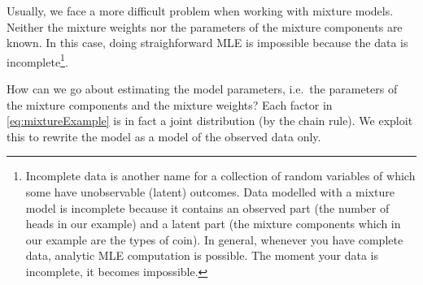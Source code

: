 \documentclass[a4paper,11pt,leqno]{report}\usepackage[]{graphicx}\usepackage[]{color}
\newcommand{\philip}[1]{ \textcolor{red}{\textbf{Philip:} #1}}
\begin{document}
Usually, we face a more difficult problem when working with mixture models. Neither the mixture
weights nor the parameters of the mixture components are known. In this case, doing straighforward MLE is impossible because the data is
incomplete\footnote{Incomplete data is 
  another name for a collection of random variables of which some have unobservable (latent) outcomes. Data modelled with a mixture model is incomplete because it contains
  an observed part (the number of heads in our example) and a latent
  part (the mixture components which in our example are the types of coin). In general, whenever you have complete data, analytic MLE computation is possible. The moment your data is incomplete, it becomes impossible.}. 

How can we go about estimating the model parameters, i.e.\ the parameters of the mixture components and the mixture weights?
Each factor
in \eqref{eq:mixtureExample} is in fact a joint distribution (by the chain rule). We exploit this to rewrite the model as a model of the
observed data only.
\end{document}
